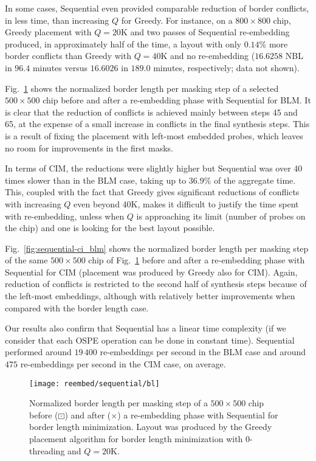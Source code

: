 In some cases, Sequential even provided comparable reduction of border
conflicts, in less time, than increasing $Q$ for Greedy. For instance, on a
$800\times 800$ chip, Greedy placement with $Q=20$K and two passes of Sequential
re-embedding produced, in approximately half of the time, a layout with only
$0.14\%$ more border conflicts than Greedy with $Q=40$K and no re-embedding
($16.6258$ NBL in $96.4$ minutes versus $16.6026$ in $189.0$ minutes,
respectively; data not shown).

Fig.~\ref{fig:sequential-bl_blm} shows the normalized border length per masking
step of a selected $500\times 500$ chip before and after a re-embedding phase
with Sequential for BLM. It is clear that the reduction of conflicts is achieved
mainly between steps 45 and 65, at the expense of a small increase in conflicts
in the final synthesis steps. This is a result of fixing the placement with
left-most embedded probes, which leaves no room for improvements in the first
masks.

In terms of CIM, the reductions were slightly higher but Sequential was over 40
times slower than in the BLM case, taking up to $36.9\%$ of the aggregate time.
This, coupled with the fact that Greedy gives significant reductions of
conflicts with increasing $Q$ even beyond 40K, makes it difficult to justify the
time spent with re-embedding, unless when $Q$ is approaching its limit (number
of probes on the chip) and one is looking for the best layout possible.

Fig.~\ref{fig:sequential-ci_blm} shows the normalized border length per masking
step of the same $500\times 500$ chip of Fig.~\ref{fig:sequential-bl_blm} before
and after a re-embedding phase with Sequential for CIM (placement was produced
by Greedy also for CIM). Again, reduction of conflicts is restricted to the
second half of synthesis steps because of the left-most embeddings, although
with relatively better improvements when compared with the border length case.

Our results also confirm that Sequential has a linear time complexity (if we
consider that each OSPE operation can be done in constant time). Sequential
performed around $19\,400$ re-embeddings per second in the BLM case and around
$475$ re-embeddings per second in the CIM case, on average.

\begin{figure}[t]\centering
\texttt{[image: reembed/sequential/bl]}
\caption{\label{fig:sequential-bl_blm}
  Normalized border length per masking step of a $500\times 500$ chip before
  ({\tiny $\boxdot$}) and after ({\tiny $\times$}) a re-embedding phase with
  Sequential for border length minimization. Layout was produced by the Greedy
  placement algorithm for border length minimization with $0$-threading and
  $Q=20$K.}
\end{figure}

